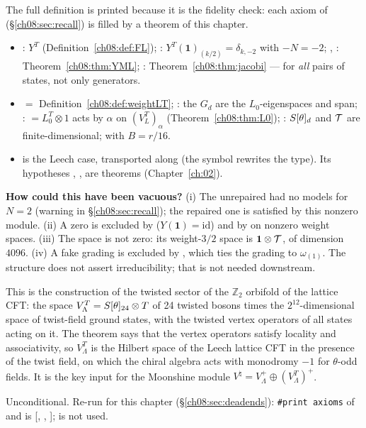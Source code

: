 \begin{dictionary}
The full definition is printed because it is the fidelity check: each axiom of
 (\S\ref{ch08:sec:recall}) is filled by a theorem of this chapter.
\begin{itemize}
\item {}: $Y^T$ (Definition~\ref{ch08:def:FL}); : $Y^T(\mathbf 1)_{(k/2)}=
  \delta_{k,-2}$ with $-N=-2$; , : Theorem~\ref{ch08:thm:YML};
  : Theorem~\ref{ch08:thm:jacobi} --- for \emph{all} pairs of states, not only
  generators.
\item {} $=$ Definition~\ref{ch08:def:weightLT}; : the $G_d$ are the
  $L_0$-eigenspaces and span; :  $=L_0^T\otimes1$ acts by $\alpha$ on
  $(V_L^T)_\alpha$ (Theorem~\ref{ch08:thm:L0}); : $S[\theta]_d$ and $\mathcal{T}$ are
  finite-dimensional;  with $B=r/16$.
\item {} is the Leech case, transported along 
  (the symbol  rewrites the type).  Its hypotheses ,
  ,  are theorems (Chapter~\ref{ch:02}).
\end{itemize}
\textbf{How could this have been vacuous?}  (i) The unrepaired  had no models for
$N=2$ (warning in \S\ref{ch08:sec:recall}); the repaired one is satisfied by this nonzero module.
(ii) A zero  is excluded by  ($Y(\mathbf 1)=\mathrm{id}$) and by
 on nonzero weight spaces.  (iii) The space is not zero: its weight-$3/2$ space is
$\mathbf 1\otimes\mathcal{T}$, of dimension $4096$.  (iv) A fake grading is excluded by
, which ties the grading to $\omega_{(1)}$.  The structure does not assert
irreducibility; that is not needed downstream.
\end{dictionary}

\begin{physics}
This is the construction of the twisted sector of the $\mathbb Z_2$ orbifold of the lattice CFT: the space $V_\Lambda^T=S[\theta]_{24}\otimes T$ of 24 twisted bosons times the $2^{12}$-dimensional space of twist-field ground states, with the twisted vertex operators of all states acting on it. The theorem says that the vertex operators satisfy locality and associativity, so $V_\Lambda^T$ is the Hilbert space of the Leech lattice CFT in the presence of the twist field, on which the chiral algebra acts with monodromy $-1$ for $\theta$-odd fields. It is the key input for the Moonshine module $V^\natural=V_\Lambda^+\oplus(V_\Lambda^T)^+$.
\end{physics}
\begin{status}
Unconditional.  Re-run for this chapter (\S\ref{ch08:sec:deadends}): \texttt{\#print axioms} of
 and  is [,
, ];  is not used.
\end{status}

